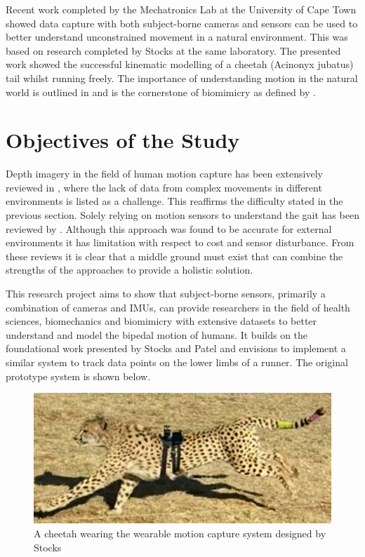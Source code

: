 Recent work \cite{patel2017trackingieee} completed by the Mechatronics Lab at the University of Cape Town showed data capture with both subject-borne cameras and sensors can be used to better understand unconstrained movement in a natural environment. This was based on research completed by Stocks \cite{bradstocks} at the same laboratory. The presented work showed the successful kinematic modelling of a cheetah (Acinonyx jubatus) tail whilst running freely. The importance of understanding motion in the natural world is outlined in \cite{patel2014rapid} and is the cornerstone of biomimicry as defined by \cite{benyus2002biomimicry}.

  
\section{Objectives of the Study}
Depth imagery in the field of human motion capture has been extensively reviewed in \cite{chen2013survey}, where the lack of data from complex movements in different environments is listed as a challenge. This reaffirms the difficulty stated in the previous section.  Solely relying on motion sensors to understand the gait has been reviewed by \cite{picerno201725}. Although this approach was found to be accurate for external environments it has limitation with respect to cost and sensor disturbance. From these reviews it is clear that a middle ground must exist that can combine the strengths of the approaches to provide a holistic solution.

This research project aims to show that subject-borne sensors, primarily a combination of cameras and IMUs, can provide researchers in the field of health sciences, biomechanics and biomimicry with extensive datasets to better understand and model the bipedal motion of humans. It builds on the foundational work presented by Stocks and Patel \cite{bradstocks} and envisions to implement a similar system to track data points on the lower limbs of a runner. The original prototype system is shown below.

\begin{figure}[!ht] 
\captionsetup{width=0.8\linewidth, font=small}  
\includegraphics[width=0.8\linewidth]{figures/introcheetah.png}
\caption{A cheetah wearing the wearable motion capture system designed by Stocks \cite{bradstocks}}
\label{fig:introcheetah}
\end{figure}

